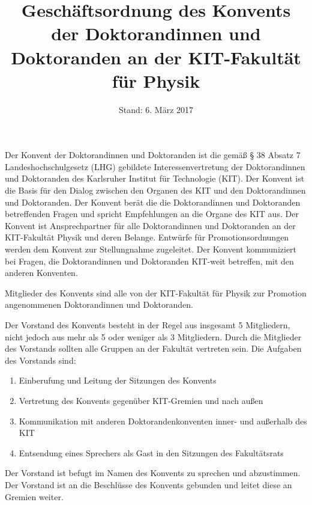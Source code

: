 \documentclass[a4paper, parskip=half, numbers=noenddot]{scrartcl}
\title{Geschäftsordnung des Konvents der Doktorandinnen und Doktoranden an der KIT-Fakultät für Physik}
\date{Stand: 6. März 2017}
\begin{document}
\maketitle



\begin{contract}


\tableofcontents


\label{aufgaben}

Der Konvent der Doktorandinnen und Doktoranden ist die gemäß § 38 Absatz 7
Landeshochschulgesetz (LHG) gebildete Interessenvertretung der Doktorandinnen und
Doktoranden des Karlsruher Institut für Technologie (KIT).
Der Konvent ist die Basis für den Dialog zwischen den Organen des KIT und den Doktorandinnen und Doktoranden.
Der Konvent berät die die Doktorandinnen und Doktoranden betreffenden Fragen und spricht Empfehlungen an die Organe des KIT aus.
Der Konvent ist Ansprechpartner für alle Doktorandinnen und Doktoranden an der KIT-Fakultät Physik und deren Belange.
Entwürfe für Promotionsordnungen werden dem Konvent zur Stellungnahme zugeleitet.
Der Konvent kommuniziert bei Fragen, die Doktorandinnen und Doktoranden KIT-weit betreffen, mit den anderen Konventen.


Mitglieder des Konvents sind alle von der KIT-Fakultät für Physik zur Promotion angenommenen Doktorandinnen und Doktoranden. 

\label{par:vorstand}

Der Vorstand des Konvents besteht in der Regel aus insgesamt 5 Mitgliedern,
nicht jedoch aus mehr als 5 oder weniger als 3 Mitgliedern.
Durch die Mitglieder des Vorstands sollten alle Gruppen an der Fakultät vertreten sein.
Die Aufgaben des Vorstands sind:
\begin{enumerate}
	\item Einberufung und Leitung der Sitzungen des Konvents
	\item Vertretung des Konvents gegenüber KIT-Gremien und nach außen
	\item Kommunikation mit anderen Doktorandenkonventen inner- und außerhalb des KIT
	\item Entsendung eines Sprechers als Gast in den Sitzungen des Fakultätsrats
\end{enumerate}
Der Vorstand ist befugt im Namen des Konvents zu sprechen und abzustimmen.
Der Vorstand ist an die Beschlüsse des Konvents gebunden und leitet diese an Gremien weiter.


\end{contract}
\end{document}

